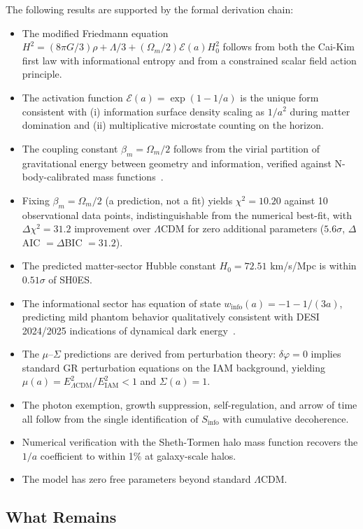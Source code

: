 \documentclass[aps,prd,twocolumn,superscriptaddress,nofootinbib]{revtex4-2}
\begin{document}
The following results are supported by the formal derivation chain:
\begin{itemize}
\item The modified Friedmann equation $H^2 = (8\pi G/3)\rho + \Lambda/3 + (\Omega_m/2)\mathcal{E}(a)H_0^2$ follows from both the Cai-Kim first law with informational entropy and from a constrained scalar field action principle.
\item The activation function $\mathcal{E}(a) = \exp(1-1/a)$ is the unique form consistent with (i) information surface density scaling as $1/a^2$ during matter domination and (ii) multiplicative microstate counting on the horizon.
\item The coupling constant $\beta_m = \Omega_m/2$ follows from the virial partition of gravitational energy between geometry and information, verified against N-body-calibrated mass functions~\cite{Sheth1999,Tinker2008}.
\item Fixing $\beta_m = \Omega_m/2$ (a prediction, not a fit) yields $\chi^2 = 10.20$ against 10 observational data points, indistinguishable from the numerical best-fit, with $\Delta\chi^2 = 31.2$ improvement over $\Lambda$CDM for zero additional parameters ($5.6\sigma$, $\Delta$AIC $= \Delta$BIC $= 31.2$).
\item The predicted matter-sector Hubble constant $H_0 = 72.51$ km/s/Mpc is within $0.51\sigma$ of SH0ES.
\item The informational sector has equation of state $w_\text{info}(a) = -1 - 1/(3a)$, predicting mild phantom behavior qualitatively consistent with DESI 2024/2025 indications of dynamical dark energy~\cite{DESI2024,DESI2025DR2}.
\item The $\mu$--$\Sigma$ predictions are derived from perturbation theory: $\delta\varphi = 0$ implies standard GR perturbation equations on the IAM background, yielding $\mu(a) = E^2_{\Lambda\text{CDM}}/E^2_\text{IAM} < 1$ and $\Sigma(a) = 1$.
\item The photon exemption, growth suppression, self-regulation, and arrow of time all follow from the single identification of $S_\text{info}$ with cumulative decoherence.
\item Numerical verification with the Sheth-Tormen halo mass function recovers the $1/a$ coefficient to within 1\% at galaxy-scale halos.
\item The model has zero free parameters beyond standard $\Lambda$CDM.
\end{itemize}

\subsection{What Remains}
\end{document}
